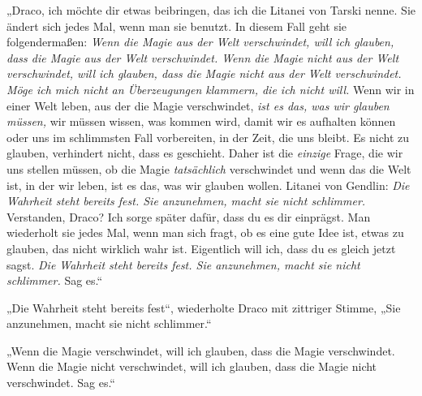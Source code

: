 „Draco, ich möchte dir etwas beibringen, das ich die Litanei von Tarski nenne. Sie ändert sich jedes Mal, wenn man sie benutzt. In diesem Fall geht sie folgendermaßen: \emph{Wenn die Magie aus der Welt verschwindet, will ich glauben, dass die Magie aus der Welt verschwindet. Wenn die Magie nicht aus der Welt verschwindet, will ich glauben, dass die Magie nicht aus der Welt verschwindet. Möge ich mich nicht an Überzeugungen klammern, die ich nicht will.} Wenn wir in einer Welt leben, aus der die Magie verschwindet, \emph{ist es das, was wir glauben müssen,} wir müssen wissen, was kommen wird, damit wir es aufhalten können oder uns im schlimmsten Fall vorbereiten, in der Zeit, die uns bleibt. Es nicht zu glauben, verhindert nicht, dass es geschieht. Daher ist die \emph{einzige} Frage, die wir uns stellen müssen, ob die Magie \emph{tatsächlich} verschwindet und wenn das die Welt ist, in der wir leben, ist es das, was wir glauben wollen. Litanei von Gendlin: \emph{Die Wahrheit steht bereits fest. Sie anzunehmen, macht sie nicht schlimmer.} Verstanden, Draco? Ich sorge später dafür, dass du es dir einprägst. Man wiederholt sie jedes Mal, wenn man sich fragt, ob es eine gute Idee ist, etwas zu glauben, das nicht wirklich wahr ist. Eigentlich will ich, dass du es gleich jetzt sagst. \emph{Die Wahrheit steht bereits fest. Sie anzunehmen, macht sie nicht schlimmer.} Sag es.“%

„Die Wahrheit steht bereits fest“, wiederholte Draco mit zittriger Stimme,
„Sie anzunehmen, macht sie nicht schlimmer.“

„Wenn die Magie verschwindet, will ich glauben, dass die Magie verschwindet. Wenn die Magie nicht verschwindet, will ich glauben, dass die Magie nicht verschwindet. Sag es.“

